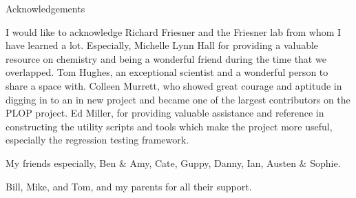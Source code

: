 {\centering
\LARGE
Acknowledgements
\par
}

I would like to acknowledge Richard Friesner and the Friesner lab from whom I have learned a lot.
Especially, Michelle Lynn Hall for providing a valuable resource on chemistry and being a wonderful friend during the time that we overlapped.
Tom Hughes, an exceptional scientist and a wonderful person to share a space with.
Colleen Murrett, who showed great courage and aptitude in digging in to an in new project and became one of the largest contributors on the PLOP project.
Ed Miller, for providing valuable assistance and reference in constructing the utility scripts and tools which make the project more useful, especially the regression testing framework. 

My friends especially, Ben & Amy, Cate, Guppy, Danny, Ian, Austen & Sophie.

Bill, Mike, and Tom, and my parents for all their support.
